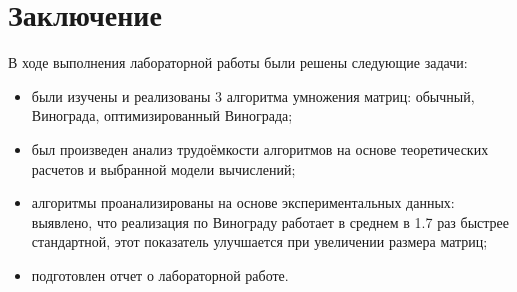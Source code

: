 \chapter*{Заключение}


В ходе выполнения лабораторной работы были решены следующие задачи:

\begin{itemize}
	\item были изучены и реализованы 3 алгоритма умножения матриц: обычный, Винограда, оптимизированный Винограда;
	\item был произведен анализ трудоёмкости алгоритмов на основе теоретических расчетов и выбранной модели вычислений;
	\item алгоритмы проанализированы на основе экспериментальных данных: выявлено, что реализация по Винограду работает в среднем в 1.7 раз быстрее стандартной, этот показатель улучшается при увеличении размера матриц;

	\item подготовлен отчет о лабораторной работе.
\end{itemize}
